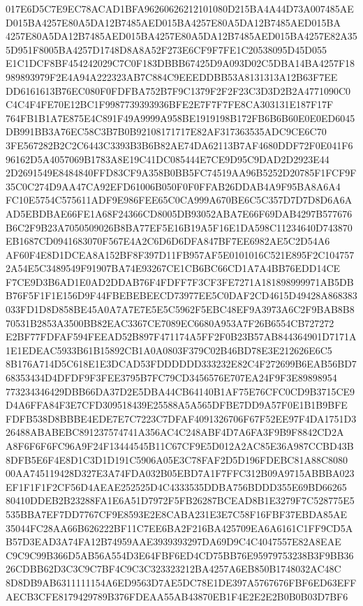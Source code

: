 \documentclass[UTF8,fontset=fandol,zihao=-4,a4paper]{ctexart}
\begin{document}
{{017E6D5C7E9EC78ACAD1BFA96260626212101080D215BA4A44D73A007485AED015BA4257E80A5DA12B7485AED015BA4257E80A5DA12B7485AED015BA
4257E80A5DA12B7485AED015BA4257E80A5DA12B7485AED015BA4257E82A355D951F8005BA4257D1748D8A8A52F273E6CF9F7FE1C20538095D45D055
E1C1DCF8BF454242029C7C0F183DBBB67425D9A093D02C5DBA14BA4257F18989893979F2E4A94A222323AB7C884C9EEEDDBB53A8131313A12B63F7EE
DD6161613B76EC080F0FDFBA752B7F9C1379F2F2F23C3D3D2B2A4771090C0C4C4F4FE70E12BC1F9987739393936BFE2E7F7F7FE8CA303131E187F17F
764FB1B1A7E875E4C891F49A9999A958BE1919198B172FB6B6B60E0E0ED6045DB991BB3A76EC58C3B7B0B92108171717E82AF317363535ADC9CE6C70
3FE567282B2C2C6443C3393B3B6B82AE74DA62113B7AF4680DDF72F0E041F696162D5A4057069B1783A8E19C41DC085444E7CE9D95C9DAD2D2923E44
2D2691549E8484840FFD83CF9A358B0BB5FC74519AA96B5252D20785F1FCF9F35C0C274D9AA47CA92EFD61006B050F0F0FFAB26DDAB4A9F95BA8A6A4
FC10E5754C575611ADF9E986FEE65C0CA999A670BE6C5C357D7D7D8D6A6AAD5EBDBAE66FE1A68F24366CD8005DB93052ABA7E66F69DAB4297B577676
B6C2F9B23A7050509026B8BA77EF5E16B19A5F16E1DA598C11234640D743870EB1687CD0941683070F567E4A2C6D6D6DFA847BF7EE6982AE5C2D54A6
AF60F4E8D1DCEA8A152BF8F397D11FB957AF5E0101016C521E895F2C1047572A54E5C3489549F91907BA74E93267CE1CB6BC66CD1A7A4BB76EDD14CE
F7CE9D3B6AD1E0AD2DDAB76F4FDFF7F3CF3FE7271A181898999971AB5DBB76F5F1F1E156D9F44FBEBEBEECD73977EE5C0DAF2CD4615D49428A868383
033FD1D8D858BE45A0A7A7E7E5E5C5962F5EBC48EF9A3973A6C2F9BAB8B870531B2853A3500BB82EAC3367CE7089EC6680A953A7F26B6554CB727272
E2BF77FDFAF594FEEAD52B897F471174A5FF2F0B23B57AB844364901D7171A1E1EDEAC5933B61B15892CB1A0A0803F379C02B46BD78E3E212626E6C5
8B176A714D5C618E1E3DCAD53FDDDDDD333232E82C4F272699B6EAB56BD768353434D4DFDF9F3FEE3795B7FC79CD3456576E707EA24F9F3E89898954
773234346429DBB66DA37D2E5DBA44CB64140B1AF75E76CFC0CD9B3715CE9D4A6FFA84F3E7CFD309518439E25588A5A565DFBE7DD9A57F0E1B1B9BFE
FDFB538D8BBBE4EDE7E7C7223C7DFAF4091326706F67F52EE97F4DA1751D326488ABABEBC891237574741A356AC4C248ABF4D7A6FA3F9B9F8842CD2A
A8F6F6F6FC96A9F24F13444545B11C67CF9E5D012A2AC85E36A987CCBD43B8DFB5E6F4E8D1C3D1D191C5906A05E3C78FAF2D5D196FDEBC81A88C8080
00AA745119428D327E3A74FDA032B05EBD7A1F7FFC312B09A9715ABBBA023EF1F1F1F2CF56D4AEAE252525D4C4333535DDBA756BDDD355E69BD66265
80410DDEB2B23288FA1E6A51D7972F5FB26287BCEAD8B1E3279F7C528775E5535BBA7EF7DD7767CF9E8593E2E8CABA231E3E7C58F16FBF37EBDA85AE
35044FC28AA66B626222BF11C7EE6BA2F216BA425709EA6A6161C1FF9CD5AB57D3EAD3A74FA12B74959AAE3939393297DA69D9C4C4047557E82A8EAE
C9C9C99B366D5AB56A554D3E64FBF6ED4CD75BB76E95979753238B3F9BB3626CDBB62D3C3C9C7BF4C9C3C323323212BA4257A6EB850B1748032AC48C
8D8DB9AB6311111154A6ED9563D7AE5DC78E1DE397A5767676FBF6ED63EFFAECB3CFE8179429789B376FDEAA55AB43870EB1F4E2E2E2B0B0B03D7BF6
}}
\end{document}
